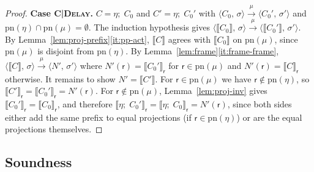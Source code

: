 \documentclass[11pt]{article}
\theoremstyle{plain}
\theoremstyle{definition}
\theoremstyle{remark}
\newcommand{\seq}{;\;}
\newcommand{\rr}{\mathsf{r}}
\newcommand{\pn}{\mathrm{pn}}
\newcommand{\conf}[2]{\langle #1,\, #2\rangle}
\newcommand{\lto}[1]{\xrightarrow{\;#1\;}}
\newcommand{\proj}[2]{\llbracket #1 \rrbracket_{#2}}
\newcommand{\projn}[1]{\llbracket #1 \rrbracket}
\newcommand{\rn}[1]{{\normalfont\scshape #1}}
\newcommand{\case}[1]{\medskip\noindent\textbf{Case #1.}\;}
\begin{document}
\begin{proof}
  \case{\rn{C|Delay}}
  $C = \eta\seq C_0$ and $C' = \eta\seq C_0'$ with
  $\conf{C_0}{\sigma}\lto{\mu}\conf{C_0'}{\sigma'}$ and
  $\pn(\eta)\cap\pn(\mu) = \emptyset$.  The induction hypothesis gives
  $\conf{\projn{C_0}}{\sigma}\lto{\mu}\conf{\projn{C_0'}}{\sigma'}$.  By
  Lemma~\ref{lem:proj-prefix}\ref{it:pp-act}, $\projn{C}$ agrees with
  $\projn{C_0}$ on $\pn(\mu)$, since $\pn(\mu)$ is disjoint from $\pn(\eta)$.
  By Lemma~\ref{lem:frame}\ref{it:frame-frame},
  $\conf{\projn{C}}{\sigma}\lto{\mu}\conf{N'}{\sigma'}$ where
  $N'(\rr) = \proj{C_0'}{\rr}$ for $\rr\in\pn(\mu)$ and $N'(\rr) = \proj{C}{\rr}$
  otherwise.  It remains to show $N' = \projn{C'}$.  For $\rr\in\pn(\mu)$ we
  have $\rr\notin\pn(\eta)$, so $\proj{C'}{\rr} = \proj{C_0'}{\rr} = N'(\rr)$.
  For $\rr\notin\pn(\mu)$, Lemma~\ref{lem:proj-inv} gives
  $\proj{C_0'}{\rr} = \proj{C_0}{\rr}$, and therefore
  $\proj{\eta\seq C_0'}{\rr} = \proj{\eta\seq C_0}{\rr} = N'(\rr)$, since both
  sides either add the same prefix to equal projections (if $\rr\in\pn(\eta)$)
  or are the equal projections themselves.
\end{proof}

\subsection{Soundness}
\end{document}
